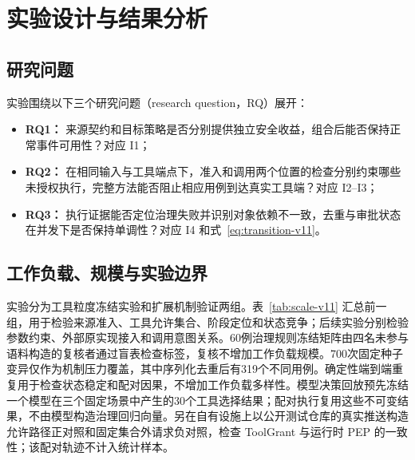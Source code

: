 \section{实验设计与结果分析}\label{sec:evaluation-v11}

\subsection{研究问题}

实验围绕以下三个研究问题（research question，RQ）展开：
\begin{itemize}
  \item \textbf{RQ1：} 来源契约和目标策略是否分别提供独立安全收益，组合后能否保持正常事件可用性？对应 I1；
  \item \textbf{RQ2：} 在相同输入与工具端点下，准入和调用两个位置的检查分别约束哪些未授权执行，完整方法能否阻止相应用例到达真实工具端？对应 I2--I3；
  \item \textbf{RQ3：} 执行证据能否定位治理失败并识别对象依赖不一致，去重与审批状态在并发下是否保持单调性？对应 I4 和式~\eqref{eq:transition-v11}。
\end{itemize}

\subsection{工作负载、规模与实验边界}

实验分为工具粒度冻结实验和扩展机制验证两组。表~\ref{tab:scale-v11} 汇总前一组，用于检验来源准入、工具允许集合、阶段定位和状态竞争；后续实验分别检验参数约束、外部原实现接入和调用意图关系。60例治理规则冻结矩阵由四名未参与语料构造的复核者通过盲表检查标签，复核不增加工作负载规模。700次固定种子变异仅作为机制压力覆盖，其中序列化去重后有319个不同用例。确定性端到端重复用于检查状态稳定和配对因果，不增加工作负载多样性。模型决策回放预先冻结一个模型在三个固定场景中产生的30个工具选择结果；配对执行复用这些不可变结果，不由模型构造治理回归向量。另在自有设施上以公开测试仓库的真实推送构造允许路径正对照和固定集合外请求负对照，检查 ToolGrant 与运行时 PEP 的一致性；该配对轨迹不计入统计样本。

